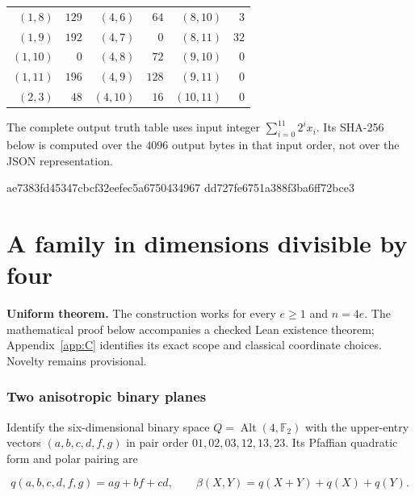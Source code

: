 \documentclass[11pt,a4paper]{article}
\newcommand{\F}{\mathbb F}
\theoremstyle{definition}
\begin{document}
\begin{center}
\begin{tabular}{rrrrrr}
$(1, 8)$ & $129$ & $(4, 6)$ & $64$ & $(8, 10)$ & $3$ \\

$(1, 9)$ & $192$ & $(4, 7)$ & $0$ & $(8, 11)$ & $32$ \\

$(1, 10)$ & $0$ & $(4, 8)$ & $72$ & $(9, 10)$ & $0$ \\

$(1, 11)$ & $196$ & $(4, 9)$ & $128$ & $(9, 11)$ & $0$ \\

$(2, 3)$ & $48$ & $(4, 10)$ & $16$ & $(10, 11)$ & $0$ \\

\bottomrule\end{tabular}\end{center}

The complete output truth table uses input integer $\sum _{i=0}^{11} 2^{i}x_{i}$. Its SHA-256 below is computed over the $4096$ output bytes in that input order, not over the JSON representation.


\begin{Code}
ae7383fd45347cbcf32eefec5a6750434967
dd727fe6751a388f3ba6ff72bce3
\end{Code}

\section{A family in dimensions divisible by four}\label{app:B}

\textbf{Uniform theorem.} The construction works for every $e\ge 1$ and $n=4e$. The mathematical proof below accompanies a checked Lean existence theorem; Appendix~\ref{app:C} identifies its exact scope and classical coordinate choices. Novelty remains provisional.


\subsubsection*{Two anisotropic binary planes}

Identify the six-dimensional binary space $Q=\operatorname{Alt}(4,\F_{2})$ with the upper-entry vectors $(a,b,c,d,f,g)$ in pair order $01,02,03,12,13,23$. Its Pfaffian quadratic form and polar pairing are


\begin{equation}\label{eq:110}
q(a,b,c,d,f,g)=ag+bf+cd,\qquad\beta(X,Y)=q(X+Y)+q(X)+q(Y).
\end{equation}
\end{document}
